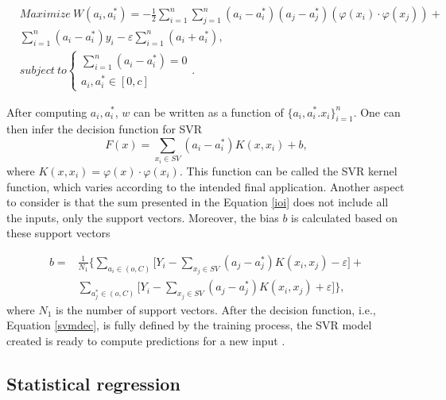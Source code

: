 \begin{equation}
\begin{split}
       & Maximize \  W(a_i, a_i^*) = -\frac{1}{2}\sum_{i=1}^{n}\sum_{j=1}^{n}(a_i-a_i^*)(a_j-a_j^*)(\varphi(x_i)\cdot \varphi(x_j)) + \\
       & \sum_{i=1}^{n}(a_i-a_i^*)y_i - \varepsilon \sum_{i=1}^{n}(a_i+a_i^*),\\
       & subject \  to \begin{cases} \sum_{i=1}^{n}(a_i-a_i^*) = 0 \\ a_i, a_i^* \in [0,c] \end{cases} .
\end{split}
\end{equation}

After computing $a_i, a_i^*$, $w$ can be written as a function of $\{ a_i, a_i^*. x_i\}_{i=1}^n$. One can then infer the decision function for \ac{SVR}
\begin{equation}
      F(x) = \sum_{x_i \in SV} (a_i-a_i^*)K(x, x_i)+b , 
      \label{ioi}
\end{equation}
where $K(x, x_i) = \varphi(x)\cdot\varphi(x_i)$. This function can be called the \ac{SVR} kernel function, which varies according to the intended final application. Another aspect to consider is that the sum presented in the Equation \ref{ioi} does not include all the inputs, only the support vectors. Moreover, the bias $b$ is calculated based on these support vectors

\begin{equation}
\begin{split}
       b = & \frac{1}{N_1} \Bigg\{ \sum_{a_i \in (o,C)} \Bigg[ Y_i-\sum_{x_j\in SV}(a_j-a_j^*)K(x_i, x_j) - \varepsilon \Bigg] + \\
           & \sum_{a^*_j \in (o,C)}\Bigg[Y_i-\sum_{x_j\in SV}(a_j-a_j^*)K(x_i, x_j) + \varepsilon\Bigg] \Bigg\},
\end{split}
\end{equation}
where $N_1$ is the number of support vectors. After the decision function, i.e., Equation \ref{svmdec}, is fully defined by the training process, the \ac{SVR} model created is ready to compute predictions for a new input \cite{review2017}.
 

\subsection{Statistical regression}


